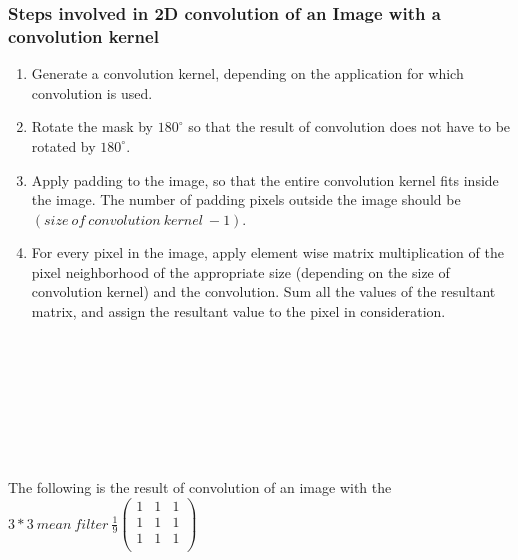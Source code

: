 \documentclass{article}
\begin{document}
		\subsubsection{Steps involved in 2D convolution of an Image with a convolution kernel}
			\begin{enumerate}
				\item Generate a convolution kernel, depending on the application for which convolution is used.
				\item Rotate the mask by $180^{\circ}$ so that the result of convolution does not have to be rotated by $180^{\circ}$.
				\item Apply padding to the image, so that the entire convolution kernel fits inside the image. The number of padding pixels outside the image should be $(size\ of\ convolution\ kernel\ - 1)$.
				\item For every pixel in the image, apply element wise matrix multiplication of the pixel neighborhood of the appropriate size (depending on the size of convolution kernel) and the convolution. Sum all the values of the resultant matrix, and assign the resultant value to the pixel in consideration.\\ \\ \\ \\ \\ \\ \\ \\ 
			\end{enumerate}

			\paragraph{}
			The following is the result of convolution of an image with the
			$3*3\ mean\ filter\  
			\frac{1}{9}
			\left(
			\begin{matrix}
			1 & 1 & 1 \\
			1 & 1 & 1 \\
			1 & 1 & 1 \\
			\end{matrix}
			\right)
			$
\end{document}
